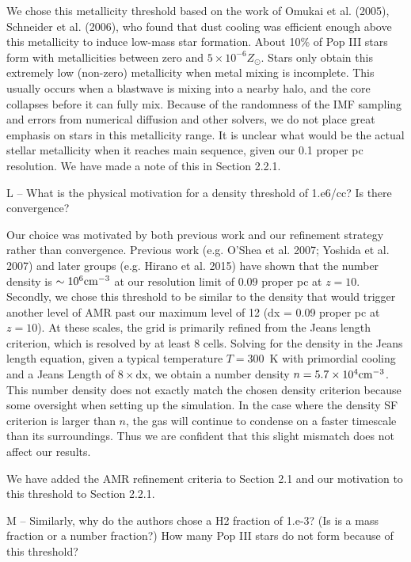 \documentclass[11pt]{article}
\newenvironment{referee}[1][]{%
    \ignorespaces%
    \begin{mdframed}[style=myquotestyle,#1]%
}{%
    \end{mdframed}%
    \ignorespacesafterend%
}%
\begin{document}
We chose this metallicity threshold based on the work of Omukai et al. (2005), Schneider et al. (2006), who found that dust cooling was efficient enough above this metallicity to induce low-mass star formation. About 10\% of Pop III stars form with metallicities between zero and $5 \times 10^{-6} Z_\odot$.  Stars only obtain this extremely low (non-zero) metallicity when metal mixing is incomplete.  This usually occurs when a blastwave is mixing into a nearby halo, and the core collapses before it can fully mix.  Because of the randomness of the IMF sampling and errors from numerical diffusion and other solvers, we do not place great emphasis on stars in this metallicity range.  It is unclear what would be the actual stellar metallicity when it reaches main sequence, given our 0.1 proper pc resolution.  We have made a note of this in Section 2.2.1.

\begin{referee}
L -- What is the physical motivation for a density threshold of 1.e6/cc? Is there convergence?
\end{referee}

Our choice was motivated by both previous work and our refinement strategy rather than convergence. Previous work (e.g. O'Shea et al. 2007; Yoshida et al. 2007) and later groups (e.g. Hirano et al. 2015) have shown that the number density is $\sim 10^6 \cubecm$ at our resolution limit of $0.09$ proper pc at $z=10$.  Secondly, we chose this threshold to be similar to the density that would trigger another level of AMR past our maximum level of 12 (dx = 0.09 proper pc at $z=10$).  At these scales, the grid is primarily refined from the Jeans length criterion, which is resolved by at least 8 cells.  Solving for the density in the Jeans length equation, given a typical temperature $T=300$~K with primordial cooling and a Jeans Length of $8 \times \textrm{dx}$, we obtain a number density $n = 5.7 \times 10^4 \cubecm$.  This number density does not exactly match the chosen density criterion because some oversight when setting up the simulation.  In the case where the density SF criterion is larger than $n$, the gas will continue to condense on a faster timescale than its surroundings.  Thus we are confident that this slight mismatch does not affect our results.

We have added the AMR refinement criteria to Section 2.1 and our motivation to this threshold to Section 2.2.1.

\begin{referee}
M -- Similarly, why do the authors chose a H2 fraction of 1.e-3? (Is is a mass fraction or a number fraction?) How many Pop III stars do not form because of this threshold?
\end{referee}
\end{document}
